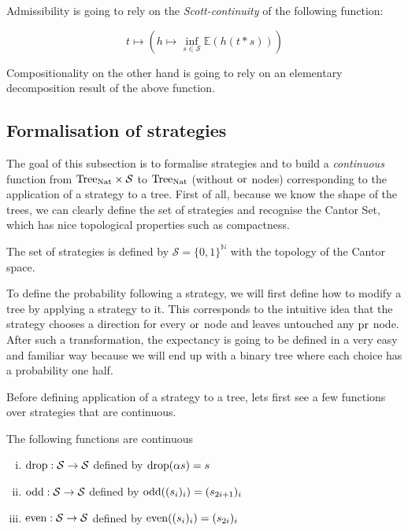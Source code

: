 Admissibility is going to rely on the \emph{Scott-continuity} 
of the following function:

\begin{equation*}
    t \mapsto \left(h \mapsto \inf_{s \in \mathcal{S}} \mathbb{E} (h
(t*s))\right)
\end{equation*}

Compositionality on the other hand is going to rely on an elementary 
decomposition result of the above function.

\subsection{Formalisation of strategies} 

The goal of this subsection is to formalise strategies and 
to build a \emph{continuous} function from $\textnormal{Tree}_{\textnormal{Nat}} \times \mathcal{S}$
to $\textnormal{Tree}_{\textnormal{Nat}}$ (without $\operatorname{or}$ nodes) corresponding to the 
application of a strategy to a tree.
First of all, because we know the shape of the trees, we can 
clearly define the set of strategies and recognise the Cantor 
Set, which has nice topological properties such as compactness.

\begin{adefinition}[Strategies]
     The set of strategies is 
     defined by $\mathcal{S} = \{ 0, 1 \}^\mathbb{N}$
     with the topology of the Cantor space.
\end{adefinition}

To define the probability following a strategy, we 
will first define how to modify a tree by applying a 
strategy to it. This corresponds to the intuitive 
idea that the strategy chooses a direction for every 
$\operatorname{or}$ node and leaves untouched any $\operatorname{pr}$ node.
After such a transformation, the expectancy is going 
to be defined in a very easy and familiar way because 
we will end up with a binary tree where each choice
has a probability one half.

Before defining application of a strategy to a tree,
lets first see a few functions over strategies 
that are continuous.

\begin{alemma}
    The following functions are continuous 
    \begin{enumerate}[(i)]
        \item $\operatorname{drop} : \mathcal{S} \to \mathcal{S}$ defined by $\operatorname{drop}(\alpha s) = s$
        \item $\operatorname{odd} : \mathcal{S} \to \mathcal{S}$ defined by $\operatorname{odd}((s_i)_i) = (s_{2i + 1})_i$
        \item $\operatorname{even} : \mathcal{S} \to \mathcal{S}$ defined by $\operatorname{even}((s_i)_i) = (s_{2i})_i$
    \end{enumerate}
\end{alemma}

